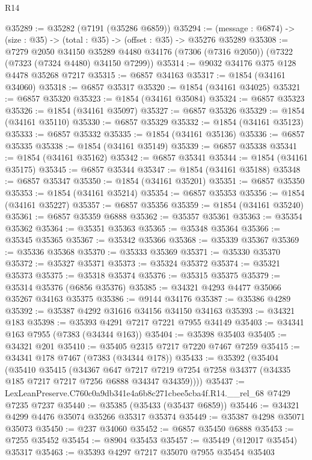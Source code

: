 \begin{lexlean}{R14}
\begin{coremodule}
@35289 := @35282 (@7191 (@35286 @6859))
@35294 := (message : @6874) -> (size : @35) -> (total : @35) -> (offset : @35) -> @35276 @35289
@35308 := @7279
    @2050
    @34150
    @35289
    @4480
    @34176
    (@7306 (@7316 @2050))
    (@7322 (@7323 (@7324 @4480) @34150 @7299))
@35314 := @9032 @34176 @375 @128 @4478 @35268 @7217
@35315 := @6857 @34163
@35317 := @1854 (@34161 @34060)
@35318 := @6857 @35317
@35320 := @1854 (@34161 @34025)
@35321 := @6857 @35320
@35323 := @1854 (@34161 @35084)
@35324 := @6857 @35323
@35326 := @1854 (@34161 @35097)
@35327 := @6857 @35326
@35329 := @1854 (@34161 @35110)
@35330 := @6857 @35329
@35332 := @1854 (@34161 @35123)
@35333 := @6857 @35332
@35335 := @1854 (@34161 @35136)
@35336 := @6857 @35335
@35338 := @1854 (@34161 @35149)
@35339 := @6857 @35338
@35341 := @1854 (@34161 @35162)
@35342 := @6857 @35341
@35344 := @1854 (@34161 @35175)
@35345 := @6857 @35344
@35347 := @1854 (@34161 @35188)
@35348 := @6857 @35347
@35350 := @1854 (@34161 @35201)
@35351 := @6857 @35350
@35353 := @1854 (@34161 @35214)
@35354 := @6857 @35353
@35356 := @1854 (@34161 @35227)
@35357 := @6857 @35356
@35359 := @1854 (@34161 @35240)
@35361 := @6857 @35359 @6888
@35362 := @35357 @35361
@35363 := @35354 @35362
@35364 := @35351 @35363
@35365 := @35348 @35364
@35366 := @35345 @35365
@35367 := @35342 @35366
@35368 := @35339 @35367
@35369 := @35336 @35368
@35370 := @35333 @35369
@35371 := @35330 @35370
@35372 := @35327 @35371
@35373 := @35324 @35372
@35374 := @35321 @35373
@35375 := @35318 @35374
@35376 := @35315 @35375
@35379 := @35314 @35376 (@6856 @35376)
@35385 := @34321 @4293 @4477 @35066 @35267 @34163 @35375
@35386 := @9144 @34176
@35387 := @35386 @4289
@35392 := @35387 @4292 @31616 @34156 @34150 @34163
@35393 := @34321 @183
@35398 := @35393 @4291 @7217 @7221 @7955 @34149
@35403 := @34341 @163 @7955 (@7383 (@34344 @163))
@35404 := @35398 @35403
@35405 := @34321 @201
@35410 := @35405 @2315 @7217 @7220 @7467 @7259
@35415 := @34341 @178 @7467 (@7383 (@34344 @178))
@35433 := @35392
    (@35404
      (@35410
        @35415
        (@34367
          @647
          @7217
          @7219
          @7254
          @7258
          @34377
          (@34335 @185 @7217 @7217 @7256 @6888 @34347 @34359))))
@35437 := LexLeanPreserve.C760c0a9db341e4a6b8c271cbee5cba4f.R14.__rel_68 @7429 @7235 @7237
@35440 := @35385 (@35433 (@35437 @6859))
@35446 := @34321 @4299 @4476 @35074 @35266 @35317 @35374
@35449 := @35387 @4298 @35071 @35073
@35450 := @237 @34060
@35452 := @6857 @35450 @6888
@35453 := @7255 @35452
@35454 := @8904 @35453
@35457 := @35449 (@12017 @35454) @35317
@35463 := @35393 @4297 @7217 @35070 @7955 @35454 @35403

\end{coremodule}
\end{lexlean}
